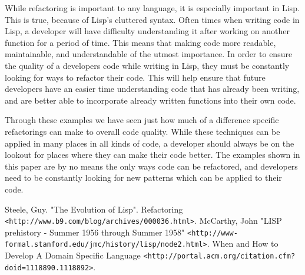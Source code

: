 \documentclass{article}
\begin{document}
While refactoring is important to any language, it is especially important in Lisp. This is true, because of Lisp’s cluttered syntax. Often times when writing code in Lisp, a developer will have difficulty understanding it after working on another function for a period of time. This means that making code more readable, maintainable, and understandable of the utmost importance. In order to ensure the quality of a developers code while writing in Lisp, they must be constantly looking for ways to refactor their code. This will help ensure that future developers have an easier time understanding code that has already been writing, and are better able to incorporate already written functions into their own code.
 
Through these examples we have seen just how much of a difference specific refactorings can make to overall code quality. While these techniques can be applied in many places in all kinds of code, a developer should always be on the lookout for places where they can make their code better. The examples shown in this paper are by no means the only ways code can be refactored, and developers need to be constantly looking for new patterns which can be applied to their code.

\begin{thebibliography}{9}
 Steele, Guy. "The Evolution of Lisp".
 Refactoring \verb!<http://www.b9.com/blog/archives/000036.html>!.
 McCarthy, John "LISP prehistory - Summer 1956 through Summer 1958" \verb!<http://www-formal.stanford.edu/jmc/history/lisp/node2.html>!.
 When and How to Develop A Domain Specific Language \verb!<http://portal.acm.org/citation.cfm?doid=1118890.1118892>!.
\end{thebibliography}
\end{document}
